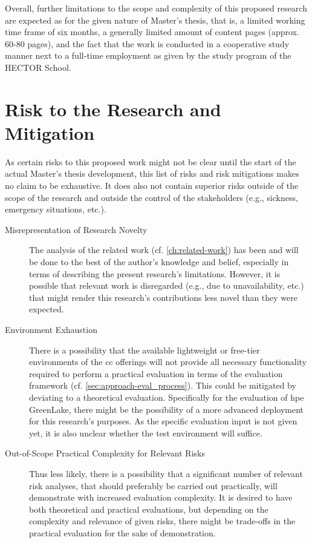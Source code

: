 {	Overall, further limitations to the scope and complexity of this proposed research are expected as for the given nature of Master's thesis, that is, a limited working time frame of six months, a generally limited amount of content pages (approx. 60-80 pages), and the fact that the work is conducted in a cooperative study manner next to a full-time employment as given by the study program of the HECTOR School.


	\section{Risk to the Research and Mitigation} \label{sec:approach-risk}
	
	As certain risks to this proposed work might not be clear until the start of the actual Master's thesis development, this list of risks and risk mitigations makes no claim to be exhaustive. It does also not contain superior risks outside of the scope of the research and outside the control of the stakeholders (e.g., sickness, emergency situations, etc.). 
	
	\begin{description}
		\item[Misrepresentation of Research Novelty] The analysis of the related work (cf. \autoref{ch:related-work}) has been and will be done to the best of the author's knowledge and belief, especially in terms   of describing the present research's limitations. However, it is possible that relevant work is disregarded (e.g., due to unavailability, etc.) that might render this research's contributions less novel than they were expected.
		\item[Environment Exhaustion] There is a possibility that the available lightweight or free-tier environments of the \ac{cc} offerings will not provide all necessary functionality required to perform a practical evaluation in terms of the evaluation framework (cf. \autoref{sec:approach-eval_process}). This could be mitigated by deviating to a theoretical evaluation. Specifically for the evaluation of \ac{hpe} GreenLake, there might be the possibility of a more advanced deployment for this research's purposes. As the specific evaluation input is not given yet, it is also unclear whether the test environment will suffice.
		\item[Out-of-Scope Practical Complexity for Relevant Risks] Thus less likely, there is a possibility that a significant number of relevant risk analyses, that should preferably be carried out practically, will demonstrate with increased evaluation complexity. It is desired to have both theoretical and practical evaluations, but depending on the complexity and relevance of given risks, there might be trade-offs in the practical evaluation for the sake of demonstration.
	

\end{description}}
